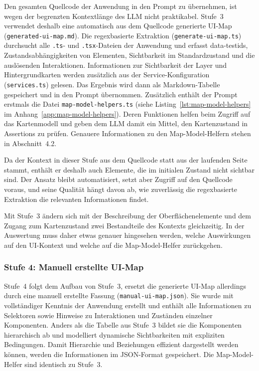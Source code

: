 Den gesamten Quellcode der Anwendung in den Prompt zu übernehmen, ist wegen der begrenzten Kontextlänge des \ac{LLM} nicht praktikabel. Stufe~3 verwendet deshalb eine automatisch aus dem Quellcode generierte \ac{UI}-Map (\texttt{generated-ui-map.md}). Die regexbasierte Extraktion (\texttt{generate-ui-map.ts}) durchsucht alle \texttt{.ts}- und \texttt{.tsx}-Dateien der Anwendung und erfasst data-testids, Zustandsabhängigkeiten von Elementen, Sichtbarkeit im Standardzustand und die auslösenden Interaktionen. Informationen zur Sichtbarkeit der Layer und Hintergrundkarten werden zusätzlich aus der Service-Konfiguration (\texttt{services.ts}) gelesen. Das Ergebnis wird dann als Markdown-Tabelle gespeichert und in den Prompt übernommen. Zusätzlich enthält der Prompt erstmals die Datei \texttt{map-model-helpers.ts} (siehe Listing~\ref{lst:map-model-helpers} im Anhang~\ref{app:map-model-helpers}). Deren Funktionen helfen beim Zugriff auf das Kartenmodell und geben dem \ac{LLM} damit ein Mittel, den Kartenzustand in Assertions zu prüfen. Genauere Informationen zu den Map-Model-Helfern stehen in Abschnitt~4.2.

Da der Kontext in dieser Stufe aus dem Quellcode statt aus der laufenden Seite stammt, enthält er deshalb auch Elemente, die im initialen Zustand nicht sichtbar sind. Der Ansatz bleibt automatisiert, setzt aber Zugriff auf den Quellcode voraus, und seine Qualität hängt davon ab, wie zuverlässig die regexbasierte Extraktion die relevanten Informationen findet.

Mit Stufe~3 ändern sich mit der Beschreibung der Oberflächenelemente und dem Zugang zum Kartenzustand zwei Bestandteile des Kontexts gleichzeitig. In der Auswertung muss daher etwas genauer hingesehen werden, welche Auswirkungen auf den \ac{UI}-Kontext und welche auf die Map-Model-Helfer zurückgehen.

\subsubsection{Stufe 4: Manuell erstellte UI-Map}

Stufe~4 folgt dem Aufbau von Stufe~3, ersetzt die generierte \ac{UI}-Map allerdings durch eine manuell erstellte Fassung (\texttt{manual-ui-map.json}). Sie wurde mit vollständiger Kenntnis der Anwendung erstellt und enthält alle Informationen zu Selektoren sowie Hinweise zu Interaktionen und Zuständen einzelner Komponenten. Anders als die Tabelle aus Stufe~3 bildet sie die Komponenten hierarchisch ab und modelliert dynamische Sichtbarkeiten mit expliziten Bedingungen. Damit Hierarchie und Beziehungen effizient dargestellt werden können, werden die Informationen im \ac{JSON}-Format gespeichert. Die Map-Model-Helfer sind identisch zu Stufe~3.

